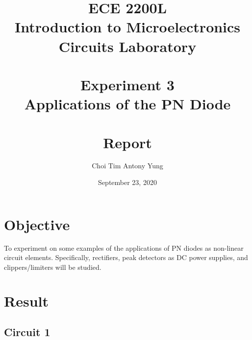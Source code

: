 \documentclass{article}
\title{ECE 2200L\\Introduction to Microelectronics Circuits Laboratory\\\,\\Experiment 3\\Applications of the PN Diode\\\,\\Report}
\author{Choi Tim Antony Yung}
\date{September 23, 2020}
\begin{document}
\maketitle

\thispagestyle{empty}
\setcounter{page}{0}

\newpage

\section*{Objective}

To experiment on some examples of the applications of PN diodes as non-linear circuit elements. Specifically, rectifiers, peak detectors as DC power supplies, and clippers/limiters will be studied.
\section*{Result}

\subsection*{Circuit 1}
\end{document}
